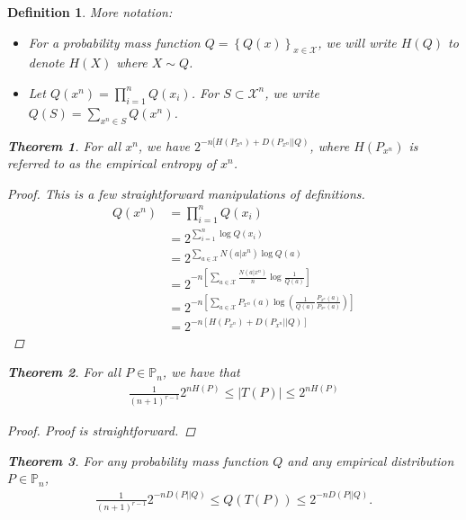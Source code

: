 \documentclass[12pt]{extarticle}
\newtheorem*{theorem}{Theorem}
\newtheorem*{definition}{Definition}
\def\XX{\mathcal{X}}
\def\PP{\mathbb{P}}
\begin{document}
\begin{definition}
More notation:

\begin{itemize}
  \item For a probability mass function $Q = \left\{ Q(x) \right\}_{x \in \XX}$, we will write $H(Q)$ to denote $H(X)$ where $X \sim Q$.
  \item Let $Q(x^n) = \prod_{i=1}^{n} Q(x_i)$.  For $S \subset \XX^n$, we write $Q(S) = \sum_{x^n \in S} Q(x^n)$.
\end{itemize}

\begin{theorem}
  For all $x^n$, we have $2^{-n [H(P_{x^n}) + D(P_{x^n} || Q)}$, where $H(P_{x^n})$ is referred to as the empirical entropy of $x^n$.
\end{theorem}

\begin{proof}
  This is a few straightforward manipulations of definitions.
  \begin{align*}
    Q(x^n) &= \prod_{i=1}^{n} Q(x_i) \\
    &= 2^{\sum_{i=1}^{n} \log Q(x_i)} \\
    &= 2^{\sum_{a \in \XX} N(a | x^n) \log Q(a)} \\
    &= 2^{-n [ \sum_{a \in \XX} \frac{N(a | x^n)}{n} \log \frac{1}{Q(a)}]} \\
    &= 2^{-n \left[ \sum_{a \in \XX} P_{x^n} (a) \log \left( \frac{1}{Q(a)} \frac{P_{x^n}(a)}{P_{x^n}(a)} \right)\right]} \\
    &= 2^{-n \left[ H(P_{x^n}) + D(P_{x^n} || Q) \right]}
  \end{align*}
\end{proof} 

\begin{theorem}
  For all $P \in \PP_n$, we have that
  \begin{align*}
    \frac{1}{(n+1)^{r-1}} 2^{n H(P)} \leq |T(P)| \leq 2^{n H(P)}
  \end{align*}
\end{theorem}

\begin{proof}
  Proof is straightforward. 
\end{proof}

\begin{theorem}
  For any probability mass function $Q$ and any empirical distribution $P \in \PP_n$,
\begin{align*}
  \frac{1}{(n+1)^{r-1}}  2^{-n D(P || Q)}  \leq Q(T(P)) \leq 2^{-n D(P || Q)}.
\end{align*}


\end{theorem}
\end{definition}
\end{document}
